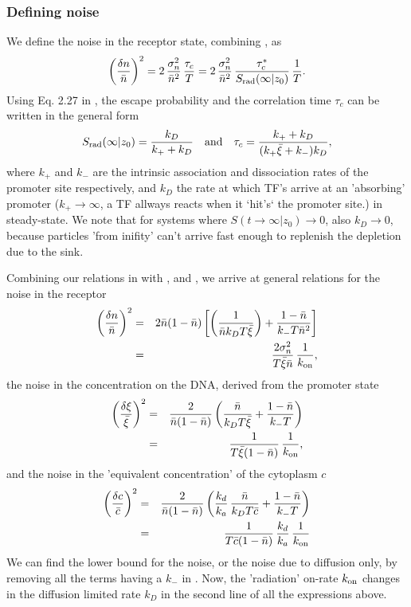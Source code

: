 \subsubsection{Defining noise}
We define the noise in the receptor state, combining , as
\begin{equation}
 \left( \frac{\delta n}{\bar{n}} \right)^2 = 2 \, \frac{\sigma_n^2}{\bar{n}^2} \, \frac{\tau_c}{T} = 2 \, \frac{\sigma_n^2}{\bar{n}^2} \, \frac{\tau_c^*}{S_{\rm rad}(\infty|z_0)} \, \frac{1}{T}.
 \elabel{EqProNoise}
\end{equation}
Using Eq. 2.27 in \cite{Agmon1990}, the escape probability and the correlation time $\tau_c$ can be written in the general form
\begin{equation}
 S_{\rm rad}(\infty|z_0) = \frac{k_D}{k_+ + k_D} \quad {\rm and} \quad \tau_c = \frac{k_+ + k_D}{(k_+ \bar{\xi} + k_-) k_D},
 \elabel{Sinfty}
\end{equation}
where $k_+$ and $k_-$ are the intrinsic association and dissociation rates of the promoter site respectively, and $k_D$ the rate at which TF's arrive at an 'absorbing' promoter ($k_+ \to \infty$, a TF allways reacts when it `hit's` the promoter site.) in steady-state. We note that for systems where $S(t\to\infty|z_0)\to0$, also $k_D\to0$, because particles 'from inifity' can't arrive fast enough to replenish the depletion due to the sink. 

Combining our relations in  with ,  and , we arrive at general relations for the noise in the receptor
\begin{eqnarray}
 \elabel{NoisePro}
 \left( \frac{\delta n}{\bar{n}} \right)^2 & = & 2 \bar{n}(1-\bar{n})\left[\left( \frac{1}{\bar{n} k_D T \bar{\xi}} \right)+\frac{1-\bar{n}}{k_- T \bar{n}^2} \right] \\
 & = & \frac{2 \sigma_n^2}{T \bar{\xi} \bar{n}} \, \frac{1}{k_{\rm on}},
\end{eqnarray}
the noise in the concentration on the DNA, derived from the promoter state
\begin{eqnarray}
 \elabel{NoiseXi}
 \left( \frac{\delta \xi}{\bar{\xi}} \right)^2 & = & \frac{2}{\bar{n}(1-\bar{n})} \left( \frac{\bar{n}}{k_D T \bar{\xi}} + \frac{1-\bar{n}}{k_- T}  \right) \\
  & = & \frac{1}{T \bar{\xi} (1 - \bar{n})} \, \frac{1}{k_{\rm on}},
\end{eqnarray}
and the noise in the 'equivalent concentration' of the cytoplasm $c$
\begin{eqnarray}
 \elabel{NoiseC} 
 \left( \frac{\delta c}{\bar{c}} \right)^2 & = & \frac{2}{\bar{n}(1-\bar{n})} \left( \frac{k_d}{k_a} \, \frac{\bar{n}}{k_D T \bar{c}} + \frac{1-\bar{n}}{k_- T}  \right) \\ \elabel{NoiseC2} 
 & = & \frac{1}{T \bar{c} (1 - \bar{n})} \, \frac{k_d}{k_a} \, \frac{1}{k_{\rm on}}
\end{eqnarray}
We can find the lower bound for the noise, or the noise due to diffusion only, by removing all the terms having a $k_-$ in . Now, the 'radiation' on-rate $k_{\rm on}$ changes in the diffusion limited rate $k_D$ in the second line of all the expressions above. 

